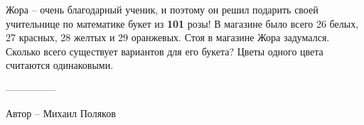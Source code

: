\question
Жора -- очень благодарный ученик, и поэтому он решил подарить своей учительнице по математике букет из \textbf{101} розы! В магазине было всего 26 белых, 27 красных, 28 желтых и 29 оранжевых. Стоя в магазине Жора задумался. Сколько всего существует вариантов для его букета? Цветы одного цвета считаются одинаковыми.

---------------

Автор -- Михаил Поляков
